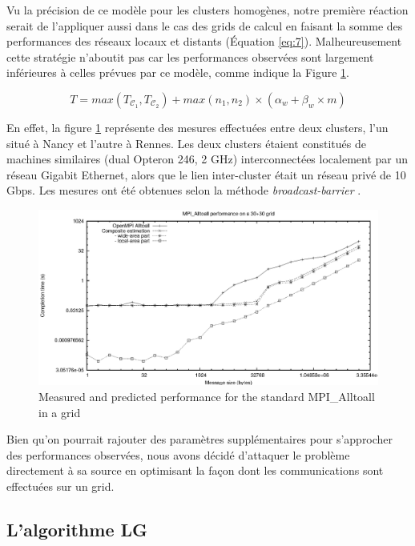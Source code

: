 Vu la précision de ce modèle pour les clusters homogènes, notre première réaction serait de l'appliquer aussi dans le cas des grids de calcul en faisant la somme des performances des réseaux locaux et distants (Équation \ref{eq:7}). Malheureusement cette stratégie n'aboutit pas car les performances observées sont largement inférieures à celles prévues par ce modèle, comme indique la Figure \ref{Figure: standard}. 

\begin{equation}
T=max(T_{\mathcal C_1},T_{\mathcal C_2})+max(n_1, n_2) \times (\alpha_w+\beta_w \times m)
\label{eq:7}\end{equation}

En effet, la figure \ref{Figure: standard} représente des mesures effectuées entre deux clusters, l'un situé à Nancy et l'autre à Rennes. Les deux clusters étaient constitués de machines similaires (dual Opteron 246, 2 GHz) interconnectées localement par un réseau Gigabit Ethernet, alors que le lien inter-cluster était un réseau privé de 10 Gbps. Les mesures ont été obtenues selon la méthode \emph{broadcast-barrier} \cite{Supinski99}.


\begin{figure}
	\begin{center}\includegraphics[width=0.7\columnwidth]{images/standard}\end{center}
	\vspace{-0.5cm}\caption{\label{Figure: standard}Measured and predicted performance for the standard MPI\_Alltoall in a grid}\vspace{-0.5cm}
\end{figure}
 
Bien qu'on pourrait rajouter des paramètres supplémentaires pour s'approcher des performances observées, nous avons décidé d'attaquer le problème directement à sa source en optimisant la façon dont les communications sont effectuées sur un grid. 


\subsection{L'algorithme LG}

